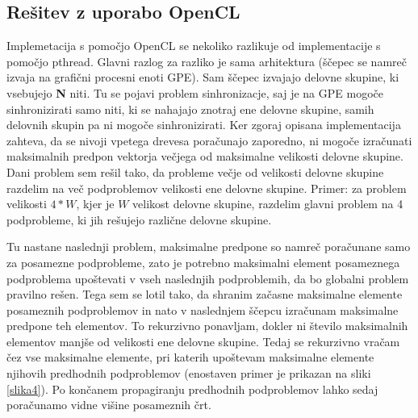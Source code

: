 \documentclass[a4paper,11pt]{article}
\begin{document}
\pagebreak
\subsection{Rešitev z uporabo OpenCL}
Implemetacija s pomočjo OpenCL se nekoliko razlikuje od implementacije s pomočjo pthread. Glavni razlog za razliko je sama arhitektura (ščepec se namreč izvaja na grafični procesni enoti GPE). Sam ščepec izvajajo delovne skupine, ki vsebujejo \textbf{N} niti. Tu se pojavi problem sinhronizacje, saj je na GPE mogoče sinhronizirati samo niti, ki se nahajajo znotraj ene delovne skupine, samih delovnih skupin pa ni mogoče sinhronizirati. Ker zgoraj opisana implementacija zahteva, da se nivoji vpetega drevesa poračunajo zaporedno, ni mogoče izračunati maksimalnih predpon vektorja večjega od maksimalne velikosti delovne skupine. Dani problem sem rešil tako, da probleme večje od velikosti delovne skupine razdelim na več podproblemov velikosti ene delovne skupine. Primer: za problem velikosti $4*W$, kjer je $W$ velikost delovne skupine, razdelim glavni problem na 4 podprobleme, ki jih rešujejo različne delovne skupine.

\noindent
Tu nastane naslednji problem, maksimalne predpone so namreč poračunane samo za posamezne podprobleme, zato je potrebno maksimalni element posameznega podproblema upoštevati v vseh naslednjih podproblemih, da bo globalni problem pravilno rešen. Tega sem se lotil tako, da shranim začasne maksimalne elemente posameznih podproblemov in nato v naslednjem ščepcu izračunam maksimalne predpone teh elementov. To rekurzivno ponavljam, dokler ni število maksimalnih elementov manjše od velikosti ene delovne skupine. Tedaj se rekurzivno vračam čez vse maksimalne elemente, pri katerih upoštevam maksimalne elemente njihovih predhodnih podproblemov (enostaven primer je prikazan na sliki \ref{slika4}). Po končanem propagiranju predhodnih podproblemov lahko sedaj poračunamo vidne višine posameznih črt.
\end{document}
